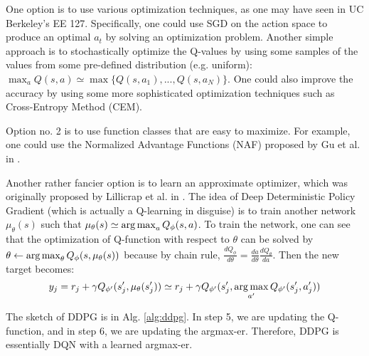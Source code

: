 One option is to use various optimization techniques, as one may have seen in UC Berkeley's EE 127. Specifically, one could use SGD on the action space to produce an optimal $a_t$ by solving an optimization problem. Another simple approach is to stochastically optimize the Q-values by using some samples of the values from some pre-defined distribution (e.g. uniform): $\max_a Q(s,a) \simeq \max \{Q(s,a_1), ..., Q(s,a_N)\}$. One could also improve the accuracy by using some more sophisticated optimization techniques such as Cross-Entropy Method (CEM).

Option no. 2 is to use function classes that are easy to maximize. For example, one could use the Normalized Advantage Functions (NAF) proposed by Gu et al. in \cite{gu2016continuous}.

Another rather fancier option is to learn an approximate optimizer, which was originally proposed by Lillicrap et al. in \cite{lillicrap2015continuous}. The idea of Deep Deterministic Policy Gradient (which is actually a Q-learning in disguise) is to train another network $\mu_\theta(s)$ such that $\mu_\theta(s) \simeq \operatorname*{arg\,max}_a Q_\phi(s,a)$. To train the network, one can see that the optimization of Q-function with respect to $\theta$ can be solved by $\theta \leftarrow \operatorname*{arg\,max}_\theta Q_\phi(s,\mu_\theta(s))$ because by chain rule, $\frac{dQ_\phi}{d\theta} = \frac{da}{d\theta}\frac{dQ_\theta}{da}$. Then the new target becomes:
$$y_j = r_j + \gamma Q_{\phi'}(s'_j,\mu_\theta(s'_j))\simeq r_j + \gamma Q_{\phi'}(s'_j, \operatorname*{arg\,max}_{a'}Q_{\phi'}(s'_j,a'_j))$$

The sketch of DDPG is in Alg. \ref{alg:ddpg}. In step 5, we are updating the Q-function, and in step 6, we are updating the argmax-er. Therefore, DDPG is essentially DQN with a learned argmax-er.



